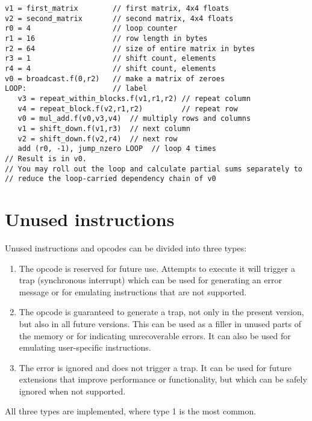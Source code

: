 \documentclass[forwardcom.tex]{subfiles}
\begin{document}
\vspace{2mm}

\begin{lstlisting}[frame=none]
v1 = first_matrix        // first matrix, 4x4 floats
v2 = second_matrix       // second matrix, 4x4 floats
r0 = 4                   // loop counter
r1 = 16                  // row length in bytes
r2 = 64                  // size of entire matrix in bytes
r3 = 1                   // shift count, elements
r4 = 4                   // shift count, elements
v0 = broadcast.f(0,r2)   // make a matrix of zeroes
LOOP:                    // label
   v3 = repeat_within_blocks.f(v1,r1,r2) // repeat column
   v4 = repeat_block.f(v2,r1,r2)         // repeat row
   v0 = mul_add.f(v0,v3,v4)  // multiply rows and columns
   v1 = shift_down.f(v1,r3)  // next column
   v2 = shift_down.f(v2,r4)  // next row
   add (r0, -1), jump_nzero LOOP  // loop 4 times
// Result is in v0.
// You may roll out the loop and calculate partial sums separately to
// reduce the loop-carried dependency chain of v0
\end{lstlisting}
\vspace{2mm}


\section{Unused instructions} \label{unusedInstructions}
Unused instructions and opcodes can be divided into three types:

\begin{enumerate}
\item The opcode is reserved for future use. Attempts to execute it will trigger a trap (synchronous interrupt) which can be used for generating an error message or for emulating instructions that are not supported.
\item The opcode is guaranteed to generate a trap, not only in the present version, but also in all future versions. This can be used as a filler in unused parts of the memory or for indicating unrecoverable errors. It can also be used for emulating user-specific instructions.
\item The error is ignored and does not trigger a trap. It can be used for future extensions that improve performance or functionality, but which can be safely ignored when not supported.
\end{enumerate}

All three types are implemented, where type 1 is the most common.
\vspace{2mm}
\end{document}
